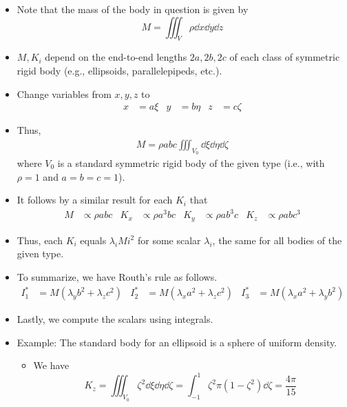 \documentclass[../notes.tex]{subfiles}
\begin{document}
\begin{itemize}
\begin{itemize}
        \item Note that the mass of the body in question is given by
        \begin{equation*}
            M = \iiint_V\rho\dd{x}\dd{y}\dd{z}
        \end{equation*}
        \item $M,K_i$ depend on the end-to-end lengths $2a,2b,2c$ of each class of symmetric rigid body (e.g., ellipsoids, parallelepipeds, etc.).
        \item Change variables from $x,y,z$ to
        \begin{align*}
            x &= a\xi&
            y &= b\eta&
            z &= c\zeta
        \end{align*}
        \item Thus,
        \begin{align*}
            M = \rho abc\iiint_{V_0}\dd{\xi}\dd{\eta}\dd{\zeta}
        \end{align*}
        where $V_0$ is a standard symmetric rigid body of the given type (i.e., with $\rho=1$ and $a=b=c=1$).
        \item It follows by a similar result for each $K_i$ that
        \begin{align*}
            M &\propto \rho abc&
            K_x &\propto \rho a^3bc&
            K_y &\propto \rho ab^3c&
            K_z &\propto \rho abc^3
        \end{align*}
        \item Thus, each $K_i$ equals $\lambda_iMi^2$ for some scalar $\lambda_i$, the same for all bodies of the given type.
        \item To summarize, we have Routh's rule as follows.
        \begin{align*}
            I_1^* &= M(\lambda_yb^2+\lambda_zc^2)&
            I_2^* &= M(\lambda_xa^2+\lambda_zc^2)&
            I_3^* &= M(\lambda_xa^2+\lambda_yb^2)
        \end{align*}
        \item Lastly, we compute the scalars using integrals.
        \item Example: The standard body for an ellipsoid is a sphere of uniform density.
        \begin{itemize}
            \item We have
            \begin{equation*}
                K_z = \iiint_{V_0}\zeta^2\dd{\xi}\dd{\eta}\dd{\zeta}
                = \int_{-1}^1\zeta^2\pi(1-\zeta^2)\dd{\zeta}
                = \frac{4\pi}{15}

\end{equation*}
\end{itemize}
\end{itemize}
\end{itemize}
\end{document}
